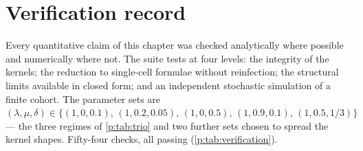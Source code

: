 
\section{Verification record}
\label{p:app:verification}

Every quantitative claim of this chapter was checked analytically where
possible and numerically where not. The suite tests
 at four levels: the integrity of the
kernels; the reduction to single-cell formulae without reinfection; the
structural limits available in closed form; and an independent stochastic
simulation of a finite cohort. The parameter sets are
$(\lambda,\mu,\delta)\in\{(1,0,0.1),\,(1,0.2,0.05),\,(1,0,0.5),\,
(1,0.9,0.1),\,(1,0.5,1/3)\}$ --- the three regimes of \cref{p:tab:trio} and
two further sets chosen to spread the kernel shapes. Fifty-four checks, all
passing (\cref{p:tab:verification}).


